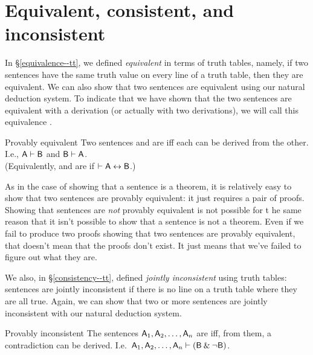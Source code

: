 \section{Equivalent, consistent, and inconsistent}

In \S\ref{equivalence--tt}, we defined \textit{equivalent} in terms of truth tables, namely, if two sentences have the same truth value on every line of a truth table, then they are equivalent. We can also show that two sentences are equivalent using our natural deduction system. To indicate that we have shown that the two sentences are equivalent with a derivation (or actually with two derivations), we will call this equivalence . 

\begin{factboxy}{Provably equivalent}
Two sentences  and  are  iff each can be derived from the other. I.e., $\mathsf{A}\vdash\mathsf{B}$ and $\mathsf{B}\vdash\mathsf{A}$.\\
(Equivalently,  and  are  if $\vdash \mathsf{A} \leftrightarrow \mathsf{B}$.)
\end{factboxy}
        
As in the case of showing that a sentence is a theorem, it is relatively easy to show that two sentences are provably equivalent: it just requires a pair of proofs. Showing that sentences are \emph{not} provably equivalent is not possible for t he same reason that it isn't possible to show that a sentence is not a theorem. Even if we fail to produce two proofs showing that two sentences are provably equivalent, that doesn't mean that the proofs don't exist. It just means that we've failed to figure out what they are. 

We also, in \S\ref{consistency--tt}, defined \textit{jointly inconsistent} using truth tables: sentences are jointly inconsistent if there is no line on a truth table where they are all true. Again, we can show that two or more sentences are jointly inconsistent with our natural deduction system. 

\begin{factboxy}{Provably inconsistent}
The sentences $\mathsf{A}_1,\mathsf{A}_2,\ldots, \mathsf{A}_n$ are  iff, from them, a contradiction can be derived. I.e.\ $\mathsf{A}_1,\mathsf{A}_2,\ldots, \mathsf{A}_n \vdash (\mathsf{B} \mathbin{\&} {\neg} \mathsf{B})$.
\end{factboxy}
        
